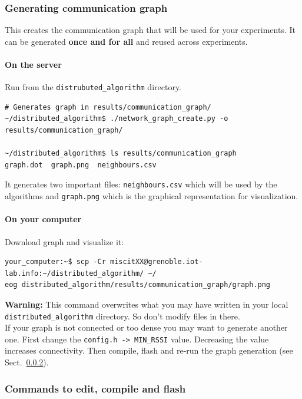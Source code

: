 \documentclass{article}
\begin{document}
\subsubsection{Generating communication graph}

This creates the communication graph that
will be used for your experiments. It can be generated \textbf{once and for all} and
reused across experiments.

\paragraph{On the server}

Run from the \verb=distrubuted_algorithm= directory.

\begin{verbatim}# Generates graph in results/communication_graph/
~/distributed_algorithm$ ./network_graph_create.py -o results/communication_graph/

~/distributed_algorithm$ ls results/communication_graph
graph.dot  graph.png  neighbours.csv \end{verbatim}

It generates two important files:
\texttt{neighbours.csv} which will be used by the algorithms and
\texttt{graph.png} which is the graphical representation for visualization.

\paragraph{On your computer} Download graph and visualize it:
\begin{verbatim}your_computer:~$ scp -Cr miscitXX@grenoble.iot-lab.info:~/distributed_algorithm/ ~/
eog distributed_algorithm/results/communication_graph/graph.png\end{verbatim}

\textbf{Warning:} This command overwrites  what you may have written
in your local \verb=distributed_algorithm= directory. So don't modify files in there.\\

If your graph is not connected or too dense you may want to generate another one.
First change the \verb=config.h -> MIN_RSSI= value. Decreasing the value
increases connectivity. Then compile, flash and re-run the graph generation (see Sect.~\ref{subsect:edit-compile-flash}).


\subsubsection{Commands to edit, compile and flash} \label{subsect:edit-compile-flash}
\end{document}
